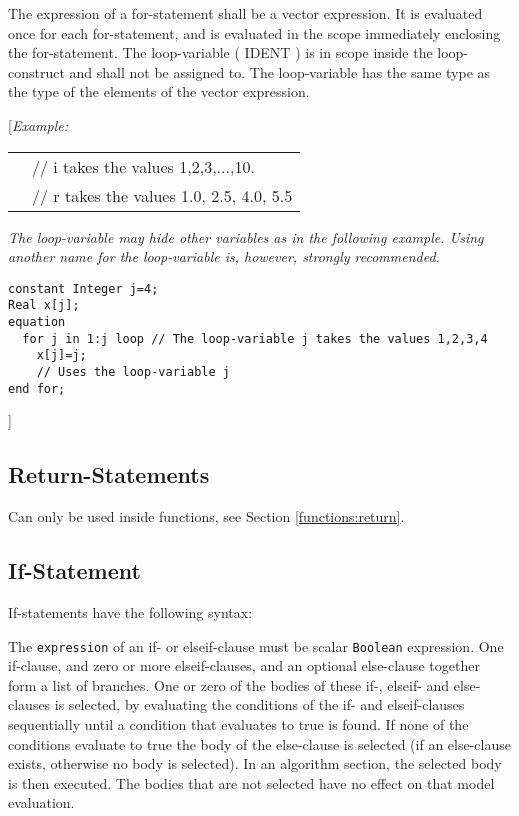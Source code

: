 \documentclass[11pt,a4paper,notitlepage]{report}
\begin{document}
The expression of a for-statement shall be a vector expression. It is evaluated once for each for-statement, and
is evaluated in the scope immediately enclosing the for-statement. The loop-variable ( IDENT ) is in scope inside
the loop-construct and shall not be assigned to. The loop-variable has the same type as the type of the elements of
the vector expression.

[\emph{Example:}
\begin{center}
\begin{tabular}{l p{3in}}
	 \verb2for i in 1:10 loop2 & // i takes the values 1,2,3,...,10. \\	
	 \verb2for i in 1: 1.5: 5.5 loop2  & // r takes the values 1.0, 2.5, 4.0, 5.5 \\
\end{tabular}
\label{tab:comments}
\end{center}

\emph{The loop-variable may hide other variables as in the following example. Using another name for the loop-variable is, however, strongly recommended.}
\begin{verbatim}
constant Integer j=4;
Real x[j];
equation
  for j in 1:j loop // The loop-variable j takes the values 1,2,3,4
    x[j]=j;
    // Uses the loop-variable j
end for;
\end{verbatim}
]

\subsection{Return-Statements}

Can only be used inside functions, see Section \ref{functions:return}.

\subsection{If-Statement}

If-statements have the following syntax:

\begin{grammar}
<if_statement> ::=
"if" <expression> "then"
"{" <statement> "\";\"" "}"
"{" "elseif" <expression> "then"
"{" <statement> "\";\"" "}"
[ "else"
"{" <statement> "\";\"" "}"
]
"end if"
\end{grammar}

The \verb"expression" of an if- or elseif-clause must be scalar \verb"Boolean" expression. One if-clause, and zero or more elseif-clauses, and an optional else-clause together form a list of branches. One or zero of the bodies of these if-,
elseif- and else-clauses is selected, by evaluating the conditions of the if- and elseif-clauses sequentially until a
condition that evaluates to true is found. If none of the conditions evaluate to true the body of the else-clause is
selected (if an else-clause exists, otherwise no body is selected). In an algorithm section, the selected body is then
executed. The bodies that are not selected have no effect on that model evaluation.
\end{document}
